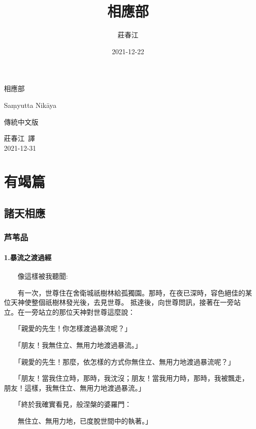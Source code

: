 \documentclass[12pt,oneside]{book}
\title{相應部}
\author{莊春江}
\date{2021-12-22}
\newcommand{\mycite}[1]{\textsuperscript{\cite{#1}}}
\newcommand{\HRule}{\rule{\linewidth}{0.5mm}}
\begin{document}
\begin{titlepage}
\begin{center}
\null \vspace{2cm}
{\fontsize{130}{140}\selectfont \jfontSansTC 相應部}

{\fontsize{45}{55}\selectfont \fontSansD Saṃyutta Nikāya}

{\Huge 傳統中文版}
\\ \vspace{0.5em}

\vfill

{\Large 莊春江\ 譯}
\\ \vspace{0.5em}
{\Large 2021-12-31}

\end{center}
\end{titlepage}

\part{有竭篇}

\chapter{諸天相應}
\section{芦苇品}

\subsection{1.暴流之渡過經}
　　像這樣被我聽聞:\mycite{g1}

　　有一次，世尊住在舍衛城祇樹林給孤獨園。那時，在夜已深時，容色絕佳的某位天神使整個祇樹林發光後，去見世尊。
抵達後，向世尊問訊，接著在一旁站立。在一旁站立的那位天神對世尊這麼說：

　　「親愛的先生！你怎樣渡過暴流呢？」

　　「朋友！我無住立、無用力地渡過暴流。」

　　「親愛的先生！那麼，依怎樣的方式你無住立、無用力地渡過暴流呢？」

　　「朋友！當我住立時，那時，我沈沒；朋友！當我用力時，那時，我被飄走，朋友！這樣，我無住立、無用力地渡過暴流。」

　　「終於我確實看見，般涅槃的婆羅門：

　　無住立、無用力地，已度脫世間中的執著。」
\end{document}
